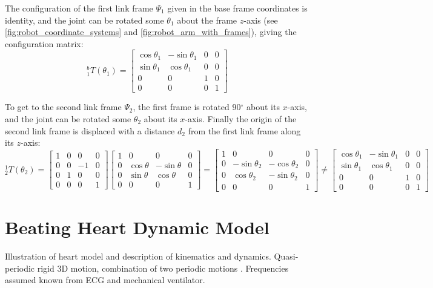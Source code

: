 The configuration of the first link frame $\Psi_1$ given in the base frame coordinates is identity, and the joint can be rotated some $\theta_1$ about the frame $z$-axis (see \autoref{fig:robot_coordinate_systems} and \ref{fig:robot_arm_with_frames}), giving the configuration matrix:
\begin{equation}
^b_1 T(\theta_1) = 
\begin{bmatrix}
\cos\theta_1 & -\sin\theta_1 & 0 & 0\\
\sin\theta_1 & \cos\theta_1 & 0 & 0\\
0 & 0 & 1 & 0\\
0& 0& 0& 1
\end{bmatrix}
\end{equation}

To get to the second link frame $\Psi_2$, the first frame is rotated 90$^\circ$ about its $x$-axis, and the joint can be rotated some $\theta_2$ about its $x$-axis. Finally the origin of the second link frame is displaced with a distance $d_2$ from the first link frame along its $z$-axis:
\begin{equation}
^1_2 T(\theta_2) = 
\begin{bmatrix}
1 & 0 & 0 & 0\\
0 & 0 & -1 & 0\\
0 & 1 & 0 & 0\\
0 & 0 &  0 & 1
\end{bmatrix} 
\begin{bmatrix}
1 & 0 & 0 & 0\\
0 & \cos\theta & -\sin\theta & 0\\
0 & \sin\theta & \cos\theta & 0\\
 0 & 0 & 0 & 1
\end{bmatrix}  
=
\begin{bmatrix}
1 & 0 & 0 & 0\\
0 & -\sin\theta_2 & -\cos\theta_2 & 0\\
0 & \cos\theta_2 & -\sin\theta_2 & 0\\
0 & 0 &  0 & 1
\end{bmatrix}
\neq
\begin{bmatrix}
\cos\theta_1 & -\sin\theta_1 & 0 & 0\\
\sin\theta_1 & \cos\theta_1 & 0 & 0\\
0 & 0 & 1 & 0\\
0& 0& 0& 1
\end{bmatrix}
\end{equation}

\section{Beating Heart Dynamic Model}
Illustration of heart model and description of kinematics and dynamics.
Quasi-periodic rigid 3D motion, combination of two periodic motions \cite{bib:heart_berkeley}. Frequencies assumed known from ECG and mechanical ventilator.

